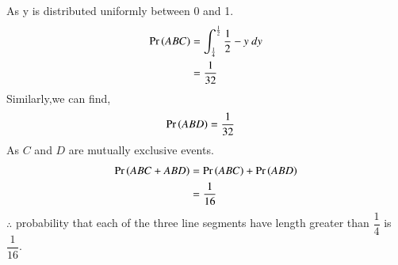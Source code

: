     As y is distributed uniformly between 0 and 1.
    \begin{align}
   \Pr\left(ABC\right) &=\int_{\frac{1}{4}}^{\frac{1}{2}}\frac{1}{2}-y~dy\\
    &=\dfrac{1}{32}
\end{align}
Similarly,we can find,
\begin{align}
    \Pr\left(ABD\right)&=\dfrac{1}{32}
\end{align}
As $C$ and $D$ are mutually exclusive events.
\begin{align}
    \Pr\left(ABC+ABD\right)&=\Pr\left(ABC\right)+\Pr\left(ABD\right)\\
    &=\dfrac{1}{16} 
\end{align}
$\therefore$ probability that each of the three line segments have length greater than $\dfrac{1}{4}$  is  $\dfrac{1}{16}$.

